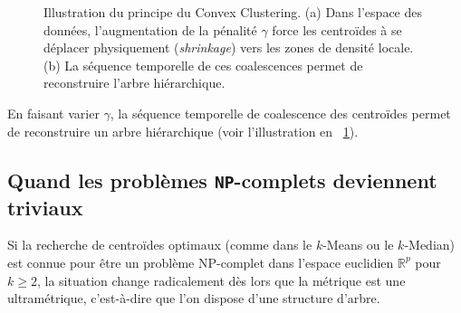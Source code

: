 \begin{figure}[ht]
    \caption{Illustration du principe du Convex Clustering. (a) Dans l'espace des données, l'augmentation de la pénalité $\gamma$ force les centroïdes à se déplacer physiquement (\textit{shrinkage}) vers les zones de densité locale. (b) La séquence temporelle de ces coalescences permet de reconstruire l'arbre hiérarchique.}
    \label{fig:convex_clustering_viz}
\end{figure}

En faisant varier $\gamma$, la séquence temporelle de coalescence des centroïdes permet de reconstruire un arbre hiérarchique (voir l'illustration en \Fig~\ref{fig:convex_clustering_viz}).

\subsection{Quand les problèmes \texttt{NP}-complets deviennent triviaux}

Si la recherche de centroïdes optimaux (comme dans le $k$-Means ou le $k$-Median) est connue pour être un problème NP-complet dans l'espace euclidien $\mathbb R^p$ pour $k \ge 2$, la situation change radicalement dès lors que la métrique est une ultramétrique, c'est-à-dire que l'on dispose d'une structure d'arbre.

